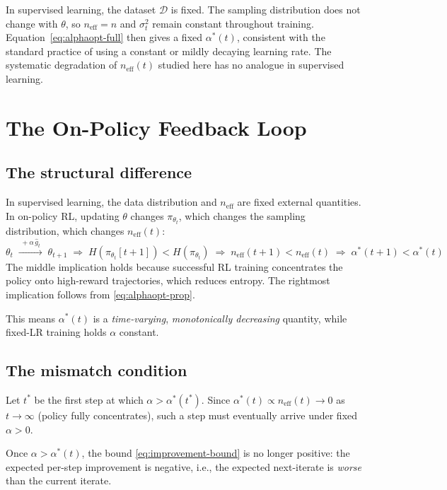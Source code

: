 \documentclass[11pt,a4paper]{article}
\newcommand{\neff}{n_{\mathrm{eff}}}
\newcommand{\ghat}{\hat{g}_t}
\newcommand{\pith}{\pi_{\theta_t}}
\newcommand{\alphaopt}{\alpha^*(t)}
\begin{document}
In supervised learning, the dataset $\mathcal{D}$ is fixed.
The sampling distribution does not change with $\theta$,
so $\neff = n$ and $\sigma_t^2$ remain constant throughout training.
Equation~\eqref{eq:alphaopt-full} then gives a fixed $\alphaopt$, consistent with
the standard practice of using a constant or mildly decaying learning rate.
The systematic degradation of $\neff(t)$ studied here has no analogue in supervised learning.

\section{The On-Policy Feedback Loop}

\subsection{The structural difference}
\label{sec:structural}

In supervised learning, the data distribution and $\neff$ are fixed external quantities.
In on-policy RL, updating $\theta$ changes $\pith$, which changes the sampling distribution,
which changes $\neff(t)$:
\begin{equation}
  \theta_t
  \;\xrightarrow{\;+\alpha\,\ghat\;}\;
  \theta_{t+1}
  \;\Rightarrow\;
  H(\pith[t+1]) < H(\pith)
  \;\Rightarrow\;
  \neff(t+1) < \neff(t)
  \;\Rightarrow\;
  \alpha^*(t+1) < \alphaopt
  \label{eq:loop-chain}
\end{equation}
The middle implication holds because successful RL training concentrates the policy onto
high-reward trajectories, which reduces entropy.
The rightmost implication follows from \eqref{eq:alphaopt-prop}.

This means $\alphaopt$ is a \emph{time-varying}, \emph{monotonically decreasing} quantity,
while fixed-LR training holds $\alpha$ constant.

\subsection{The mismatch condition}
\label{sec:mismatch}

Let $t^*$ be the first step at which $\alpha > \alpha^*(t^*)$.
Since $\alphaopt \propto \neff(t) \to 0$ as $t \to \infty$ (policy fully concentrates),
such a step must eventually arrive under fixed $\alpha > 0$.

Once $\alpha > \alpha^*(t)$, the bound \eqref{eq:improvement-bound} is no longer positive:
the expected per-step improvement is negative, i.e., the expected next-iterate is \emph{worse}
than the current iterate.
\end{document}
